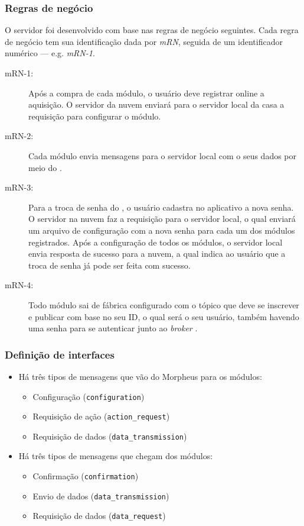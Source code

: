 \subsubsection{Regras de negócio}
O servidor foi desenvolvido com base nas regras de negócio seguintes. Cada regra de negócio tem sua identificação dada por \emph{mRN}, seguida de um identificador numérico --- e.g. \emph{mRN-1}.
\begin{description}
\item[mRN-1:]Após a compra de cada módulo, o usuário deve registrar online a aquisição. O servidor da nuvem enviará para o servidor local da casa a requisição para configurar o módulo.
\item[mRN-2:]Cada módulo envia mensagens para o servidor local com o seus dados por meio do \wmqtt{}.
\item[mRN-3:]Para a troca de senha do \wwifi, o usuário cadastra no aplicativo a nova senha. O servidor na nuvem faz a requisição para o servidor local, o qual enviará um arquivo de configuração com a nova senha para cada um dos módulos registrados. Após a configuração de todos os módulos, o servidor local envia resposta de sucesso para a nuvem, a qual indica ao usuário que a troca de senha já pode ser feita com sucesso.
\item[mRN-4:]Todo módulo sai de fábrica configurado com o tópico que deve se inscrever e publicar com base no seu ID, o qual será o seu usuário, também havendo uma senha para se autenticar junto ao \emph{broker} \wmqtt{}.
\end{description}

\subsubsection{Definição de interfaces}
\begin{itemize}
\item Há três tipos de mensagens que vão do Morpheus para os módulos:
  \begin{itemize}
  \item Configuração (\texttt{configuration})
  \item Requisição de ação (\texttt{action\_request})
  \item Requisição de dados (\texttt{data\_transmission})
  \end{itemize}
\item Há três tipos de mensagens que chegam dos módulos:
  \begin{itemize}
  \item Confirmação (\texttt{confirmation})
  \item Envio de dados (\texttt{data\_transmission})
  \item Requisição de dados (\texttt{data\_request})
  \end{itemize}
\end{itemize}

